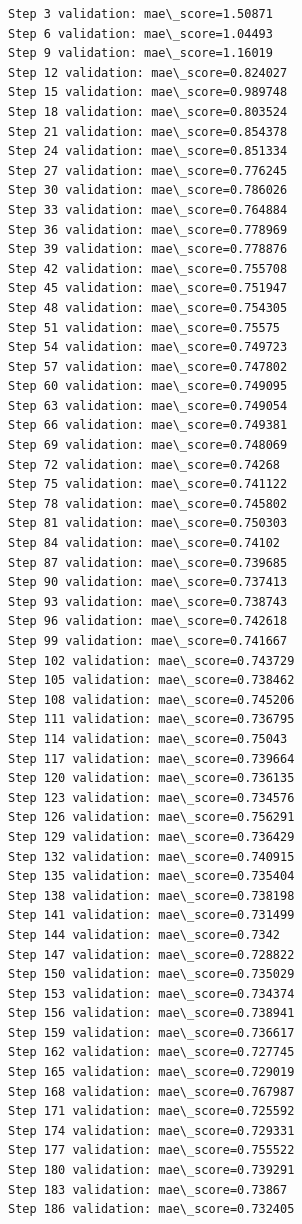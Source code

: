 \documentclass[11pt]{article}
\begin{document}
    \begin{Verbatim}[commandchars=\\\{\}]
Step 3 validation: mae\_score=1.50871
Step 6 validation: mae\_score=1.04493
Step 9 validation: mae\_score=1.16019
Step 12 validation: mae\_score=0.824027
Step 15 validation: mae\_score=0.989748
Step 18 validation: mae\_score=0.803524
Step 21 validation: mae\_score=0.854378
Step 24 validation: mae\_score=0.851334
Step 27 validation: mae\_score=0.776245
Step 30 validation: mae\_score=0.786026
Step 33 validation: mae\_score=0.764884
Step 36 validation: mae\_score=0.778969
Step 39 validation: mae\_score=0.778876
Step 42 validation: mae\_score=0.755708
Step 45 validation: mae\_score=0.751947
Step 48 validation: mae\_score=0.754305
Step 51 validation: mae\_score=0.75575
Step 54 validation: mae\_score=0.749723
Step 57 validation: mae\_score=0.747802
Step 60 validation: mae\_score=0.749095
Step 63 validation: mae\_score=0.749054
Step 66 validation: mae\_score=0.749381
Step 69 validation: mae\_score=0.748069
Step 72 validation: mae\_score=0.74268
Step 75 validation: mae\_score=0.741122
Step 78 validation: mae\_score=0.745802
Step 81 validation: mae\_score=0.750303
Step 84 validation: mae\_score=0.74102
Step 87 validation: mae\_score=0.739685
Step 90 validation: mae\_score=0.737413
Step 93 validation: mae\_score=0.738743
Step 96 validation: mae\_score=0.742618
Step 99 validation: mae\_score=0.741667
Step 102 validation: mae\_score=0.743729
Step 105 validation: mae\_score=0.738462
Step 108 validation: mae\_score=0.745206
Step 111 validation: mae\_score=0.736795
Step 114 validation: mae\_score=0.75043
Step 117 validation: mae\_score=0.739664
Step 120 validation: mae\_score=0.736135
Step 123 validation: mae\_score=0.734576
Step 126 validation: mae\_score=0.756291
Step 129 validation: mae\_score=0.736429
Step 132 validation: mae\_score=0.740915
Step 135 validation: mae\_score=0.735404
Step 138 validation: mae\_score=0.738198
Step 141 validation: mae\_score=0.731499
Step 144 validation: mae\_score=0.7342
Step 147 validation: mae\_score=0.728822
Step 150 validation: mae\_score=0.735029
Step 153 validation: mae\_score=0.734374
Step 156 validation: mae\_score=0.738941
Step 159 validation: mae\_score=0.736617
Step 162 validation: mae\_score=0.727745
Step 165 validation: mae\_score=0.729019
Step 168 validation: mae\_score=0.767987
Step 171 validation: mae\_score=0.725592
Step 174 validation: mae\_score=0.729331
Step 177 validation: mae\_score=0.755522
Step 180 validation: mae\_score=0.739291
Step 183 validation: mae\_score=0.73867
Step 186 validation: mae\_score=0.732405

\end{Verbatim}
\end{document}
